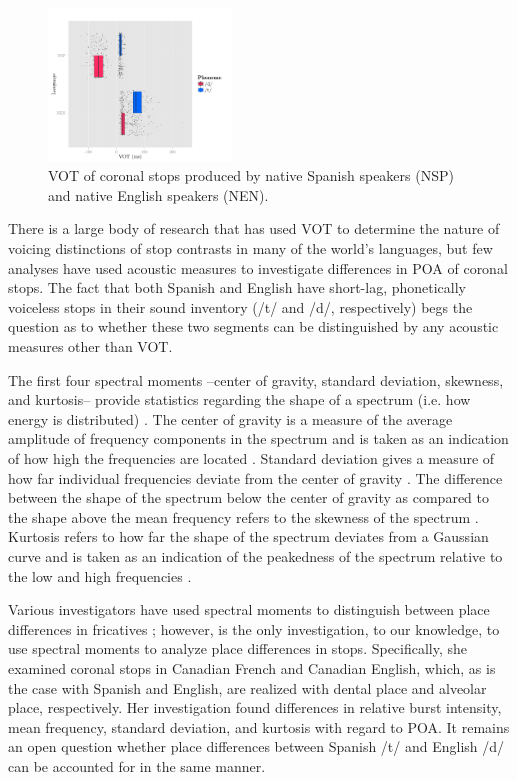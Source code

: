 \documentclass[a4paper,10pt,twocolumn]{article}\usepackage[]{graphicx}\usepackage[]{color}
\begin{document}
	\begin{figure}[h]
	\centering
	{\scriptsize{\caption{VOT of coronal stops produced by native Spanish speakers (NSP) and native English speakers (NEN).\label{fig:dt_vot}}}}
	\includegraphics[width=0.435\textwidth]{../figures/vot.pdf}
	\end{figure}


	There is a large body of research that has used VOT to determine the nature of voicing distinctions of stop contrasts in many of the world's languages, but few analyses have used acoustic measures to investigate differences in POA of coronal stops. The fact that both Spanish and English have short-lag, phonetically voiceless stops in their sound inventory (/t/ and /d/, respectively) begs the question as to whether these two segments can be distinguished by any acoustic measures other than VOT. 
	
	The first four spectral moments --center of gravity, standard deviation, skewness, and kurtosis-- provide statistics regarding the shape of a spectrum (i.e. how energy is distributed) \cite{jones2013bloomsbury}. The center of gravity is a measure of the average amplitude of frequency components in the spectrum and is taken as an indication of how high the frequencies are located \cite{Praat}. Standard deviation gives a measure of how far individual frequencies deviate from the center of gravity \cite{jones2013bloomsbury}. The difference between the shape of the spectrum below the center of gravity as compared to the shape above the mean frequency refers to the skewness of the spectrum \cite{Praat}. Kurtosis refers to how far the shape of the spectrum deviates from a Gaussian curve and is taken as an indication of the peakedness of the spectrum relative to the low and high frequencies \cite{hardcastle2012handbook}. 

	Various investigators have used spectral moments to distinguish between place differences in fricatives \cite{gordon2002cross,jongman2000acoustic}; however, \cite{sundara2005acoustic} is the only investigation, to our knowledge, to use spectral moments to analyze place differences in stops. Specifically, she examined coronal stops in Canadian French and Canadian English, which, as is the case with Spanish and English, are realized with dental place and alveolar place, respectively. Her investigation found differences in relative burst intensity, mean frequency, standard deviation, and kurtosis with regard to POA. It remains an open question whether place differences between Spanish /t/ and English /d/ can be accounted for in the same manner. 
\end{document}
